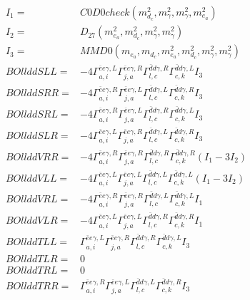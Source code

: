 \documentclass[A4,landscape]{article}
\begin{document}
\begin{align} 
I_1 = & C0D0check(m^2_{d_{{c}}}, m^2_{\gamma}, m^2_{\gamma}, m^2_{e_{{a}}}) \\ 
I_2 = & D_{27}(m^2_{e_{{a}}}, m^2_{d_{{c}}}, m^2_{\gamma}, m^2_{\gamma}) \\ 
I_3 = & MMD0(m_{e_{{a}}}, m_{d_{{c}}}, m^2_{e_{{a}}}, m^2_{d_{{c}}}, m^2_{\gamma}, m^2_{\gamma}) \\ 
  BOllddSLL= & -4  \Gamma^{\bar{e}e \gamma ,L}_{a, i} \Gamma^{\bar{e}e \gamma ,R}_{j, a} \Gamma^{\bar{d}d \gamma ,R}_{l, c} \Gamma^{\bar{d}d \gamma ,L}_{c, k} I_3 \\ 
  BOllddSRR= & -4  \Gamma^{\bar{e}e \gamma ,R}_{a, i} \Gamma^{\bar{e}e \gamma ,L}_{j, a} \Gamma^{\bar{d}d \gamma ,L}_{l, c} \Gamma^{\bar{d}d \gamma ,R}_{c, k} I_3 \\ 
  BOllddSRL= & -4  \Gamma^{\bar{e}e \gamma ,R}_{a, i} \Gamma^{\bar{e}e \gamma ,L}_{j, a} \Gamma^{\bar{d}d \gamma ,R}_{l, c} \Gamma^{\bar{d}d \gamma ,L}_{c, k} I_3 \\ 
  BOllddSLR= & -4  \Gamma^{\bar{e}e \gamma ,L}_{a, i} \Gamma^{\bar{e}e \gamma ,R}_{j, a} \Gamma^{\bar{d}d \gamma ,L}_{l, c} \Gamma^{\bar{d}d \gamma ,R}_{c, k} I_3 \\ 
  BOllddVRR= & -4  \Gamma^{\bar{e}e \gamma ,R}_{a, i} \Gamma^{\bar{e}e \gamma ,R}_{j, a} \Gamma^{\bar{d}d \gamma ,R}_{l, c} \Gamma^{\bar{d}d \gamma ,R}_{c, k} (I_1 - 3 I_2) \\ 
  BOllddVLL= & -4  \Gamma^{\bar{e}e \gamma ,L}_{a, i} \Gamma^{\bar{e}e \gamma ,L}_{j, a} \Gamma^{\bar{d}d \gamma ,L}_{l, c} \Gamma^{\bar{d}d \gamma ,L}_{c, k} (I_1 - 3 I_2) \\ 
  BOllddVRL= & -4  \Gamma^{\bar{e}e \gamma ,R}_{a, i} \Gamma^{\bar{e}e \gamma ,R}_{j, a} \Gamma^{\bar{d}d \gamma ,L}_{l, c} \Gamma^{\bar{d}d \gamma ,L}_{c, k} I_1 \\ 
  BOllddVLR= & -4  \Gamma^{\bar{e}e \gamma ,L}_{a, i} \Gamma^{\bar{e}e \gamma ,L}_{j, a} \Gamma^{\bar{d}d \gamma ,R}_{l, c} \Gamma^{\bar{d}d \gamma ,R}_{c, k} I_1 \\ 
  BOllddTLL= &  \Gamma^{\bar{e}e \gamma ,L}_{a, i} \Gamma^{\bar{e}e \gamma ,R}_{j, a} \Gamma^{\bar{d}d \gamma ,R}_{l, c} \Gamma^{\bar{d}d \gamma ,L}_{c, k} I_3 \\ 
  BOllddTLR= & 0 \\ 
  BOllddTRL= & 0 \\ 
  BOllddTRR= &  \Gamma^{\bar{e}e \gamma ,R}_{a, i} \Gamma^{\bar{e}e \gamma ,L}_{j, a} \Gamma^{\bar{d}d \gamma ,L}_{l, c} \Gamma^{\bar{d}d \gamma ,R}_{c, k} I_3 \\ 
\end{align} 
\end{document}
